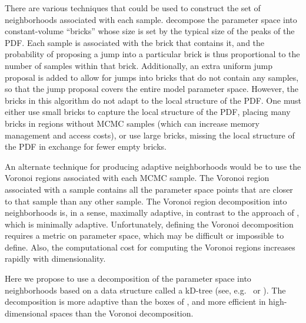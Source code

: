 \documentclass{rsos}
\begin{document}
There are various
techniques that could be used to construct the set of neighborhoods
associated with each sample.
\cite{Littenberg2009} decompose the parameter space into
constant-volume ``bricks'' whose size is set by the typical size of
the peaks of the PDF.  Each sample is associated with the brick that
contains it, and the probability of proposing a jump into a particular brick is thus proportional to the
number of samples within that brick.  Additionally, an extra uniform jump proposal is added to allow for jumps into bricks that do not contain any samples, so that the jump 
proposal covers the entire model parameter space.  
However, the bricks in this algorithm do not adapt to the local
structure of the PDF.  One must either use small bricks to capture the
local structure of the PDF, placing many bricks in regions without
MCMC samples (which can increase memory management and access costs),
or use large bricks, missing the local structure of the PDF in
exchange for fewer empty bricks.

An alternate technique for producing adaptive neighborhoods would be
to use the Voronoi regions \cite{Voronoi1907} associated with each
MCMC sample.  The Voronoi region associated with a sample contains all
the parameter space points that are closer to that sample than any
other sample.  The Voronoi region decomposition into neighborhoods is,
in a sense, maximally adaptive, in contrast to the approach of
\cite{Littenberg2009}, which is minimally adaptive.
Unfortunately, defining the Voronoi decomposition requires a metric on
parameter space, which may be difficult or impossible to define.
Also, the computational cost for computing the Voronoi regions
increases rapidly with dimensionality.  

Here we propose to use a decomposition of the parameter space into
neighborhoods based on a data structure called a kD-tree (see,
e.g.\ \cite{Berg2008} or \cite{Gaede1998}).  The decomposition is more
adaptive than the boxes of \cite{Littenberg2009}, and more
efficient in high-dimensional spaces than the Voronoi decomposition.
\end{document}
